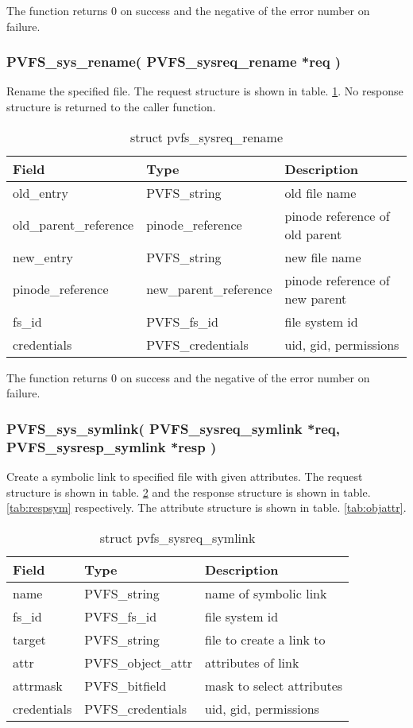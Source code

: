 \documentclass[11pt, letterpaper]{article}
\begin{document}
The function returns 0 on success and the negative of the error
number on failure.

\subsubsection{PVFS\_sys\_rename(
PVFS\_sysreq\_rename *req
)}

Rename the specified file. The request structure is shown in table.
 \ref{tab:reqrename}. No response structure is returned to the caller
function.

\begin{table}[H]
\begin{tabular}{|l|l|l|}
\hline
Field & Type & Description \\
\hline
\hline
old\_entry & PVFS\_string & old file name \\
\hline
old\_parent\_reference & pinode\_reference & pinode reference of old parent \\
\hline
new\_entry & PVFS\_string & new file name \\
\hline
pinode\_reference & new\_parent\_reference & pinode reference of new
parent  \\
\hline
fs\_id & PVFS\_fs\_id & file system id \\
\hline
credentials & PVFS\_credentials & uid, gid, permissions \\
\hline
\end{tabular}
\caption{struct pvfs\_sysreq\_rename}\label{tab:reqrename}
\end{table}

The function returns 0 on success and the negative of the error
number on failure.

\subsubsection{PVFS\_sys\_symlink(
PVFS\_sysreq\_symlink *req,
PVFS\_sysresp\_symlink *resp
)}

Create a symbolic link to specified file with given attributes. The
request structure is shown in table. \ref{tab:reqsym} and the response
structure is shown in table. \ref{tab:respsym} respectively. The
attribute structure is shown in table. \ref{tab:objattr}.

\begin{table}[H]
\begin{tabular}{|l|l|l|}
\hline
Field & Type & Description \\
\hline
\hline
name & PVFS\_string & name of symbolic link \\
\hline
fs\_id & PVFS\_fs\_id & file system id \\
\hline
target & PVFS\_string & file to create a link to \\
\hline
attr & PVFS\_object\_attr & attributes of link \\
\hline
attrmask & PVFS\_bitfield & mask to select attributes \\
\hline
credentials & PVFS\_credentials & uid, gid, permissions \\
\hline
\end{tabular}
\caption{struct pvfs\_sysreq\_symlink}\label{tab:reqsym}
\end{table}
\end{document}
